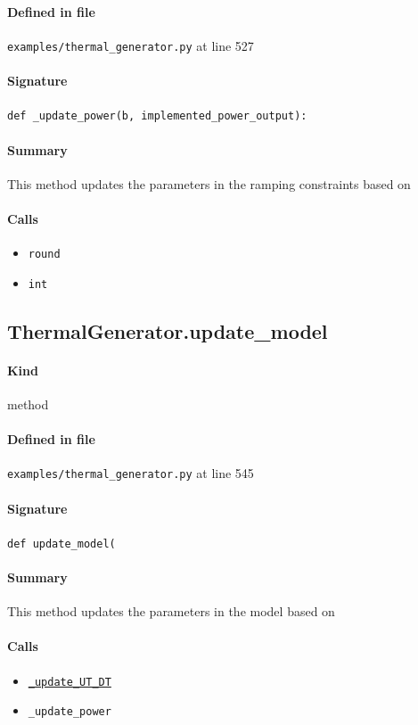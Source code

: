 \documentclass[11pt]{report}
\begin{document}
\paragraph{Defined in file} \texttt{examples/thermal\_generator.py} at line 527
\paragraph{Signature} \texttt{def \_update\_power(b, implemented\_power\_output):}
\paragraph{Summary} This method updates the parameters in the ramping constraints based on
\paragraph{Calls}
\begin{itemize}[leftmargin=*]
  \item \texttt{round}
  \item \texttt{int}
\end{itemize}
\subsection{ThermalGenerator.update\_model}
\label{def:examples-thermal_generator.py:ThermalGenerator.update_model:L545}
\paragraph{Kind} method
\paragraph{Defined in file} \texttt{examples/thermal\_generator.py} at line 545
\paragraph{Signature} \texttt{def update\_model(}
\paragraph{Summary} This method updates the parameters in the model based on
\paragraph{Calls}
\begin{itemize}[leftmargin=*]
  \item \hyperref[def:examples-thermal_generator.py:ThermalGenerator._update_UT_DT:L480]{\texttt{\_update\_UT\_DT}}
  \item \texttt{\_update\_power}
\end{itemize}
\end{document}
